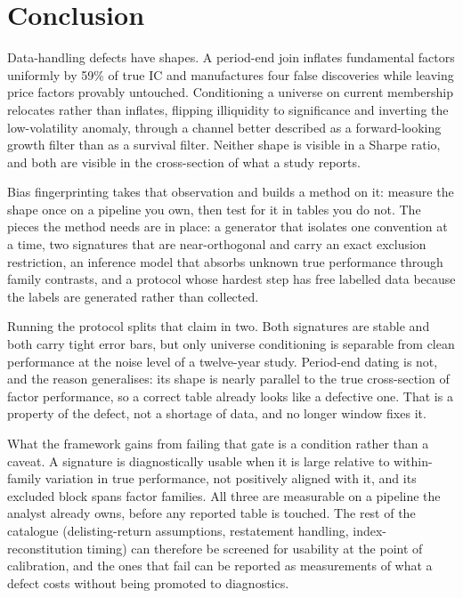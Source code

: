 \documentclass[11pt]{article}
\begin{document}
\section{Conclusion}

Data-handling defects have shapes. A period-end join inflates fundamental factors
uniformly by 59\% of true IC and manufactures four false discoveries while leaving price
factors provably untouched. Conditioning a universe on current membership relocates rather
than inflates, flipping illiquidity to significance and inverting the low-volatility
anomaly, through a channel better described as a forward-looking growth filter than as a
survival filter. Neither shape is visible in a Sharpe ratio, and both are visible in the
cross-section of what a study reports.

Bias fingerprinting takes that observation and builds a method on it: measure the shape
once on a pipeline you own, then test for it in tables you do not. The pieces the method
needs are in place: a generator that isolates one convention at a time, two signatures
that are near-orthogonal and carry an exact exclusion restriction, an inference model that
absorbs unknown true performance through family contrasts, and a protocol whose hardest
step has free labelled data because the labels are generated rather than collected.

Running the protocol splits that claim in two. Both signatures are stable and both
carry tight error bars, but only universe conditioning is separable from clean
performance at the noise level of a twelve-year study. Period-end dating is not, and
the reason generalises: its shape is nearly parallel to the true cross-section of
factor performance, so a correct table already looks like a defective one. That is a
property of the defect, not a shortage of data, and no longer window fixes it.

What the framework gains from failing that gate is a condition rather than a caveat.
A signature is diagnostically usable when it is large relative to within-family
variation in true performance, not positively aligned with it, and its excluded
block spans factor families. All three are measurable on a pipeline the analyst
already owns, before any reported table is touched. The rest of the catalogue (delisting-return
assumptions, restatement handling, index-reconstitution timing) can therefore be screened for usability at the point of calibration, and the ones
that fail can be reported as measurements of what a defect costs without being
promoted to diagnostics.
\end{document}
